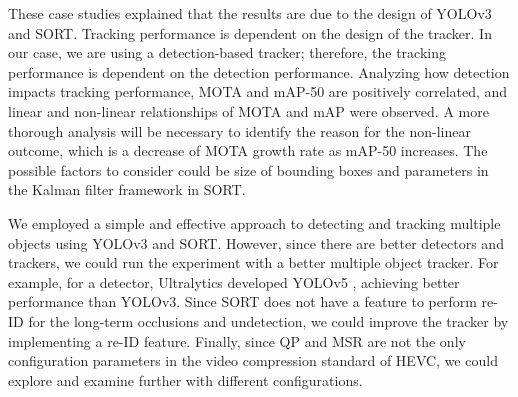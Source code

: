 These case studies explained that the results are due to the design of YOLOv3 and SORT. Tracking performance is dependent on the design of the tracker. In our case, we are using a detection-based tracker; therefore, the tracking performance is dependent on the detection performance. Analyzing how detection impacts tracking performance, MOTA and mAP-50 are positively correlated, and linear and non-linear relationships of MOTA and mAP were observed. A more thorough analysis will be necessary to identify the reason for the non-linear outcome, which is a decrease of MOTA growth rate as mAP-50 increases. The possible factors to consider could be size of bounding boxes and parameters in the Kalman filter framework in SORT.

We employed a simple and effective approach to detecting and tracking multiple objects using YOLOv3 and SORT. However, since there are better detectors and trackers, we could run the experiment with a better multiple object tracker. For example, for a detector, Ultralytics developed YOLOv5 \cite{jocher_ultralyticsyolov5_2021}, achieving better performance than YOLOv3. Since SORT does not have a feature to perform re-ID for the long-term occlusions and undetection, we could improve the tracker by implementing a re-ID feature. Finally, since QP and MSR are not the only configuration parameters in the video compression standard of HEVC, we could explore and examine further with different configurations.